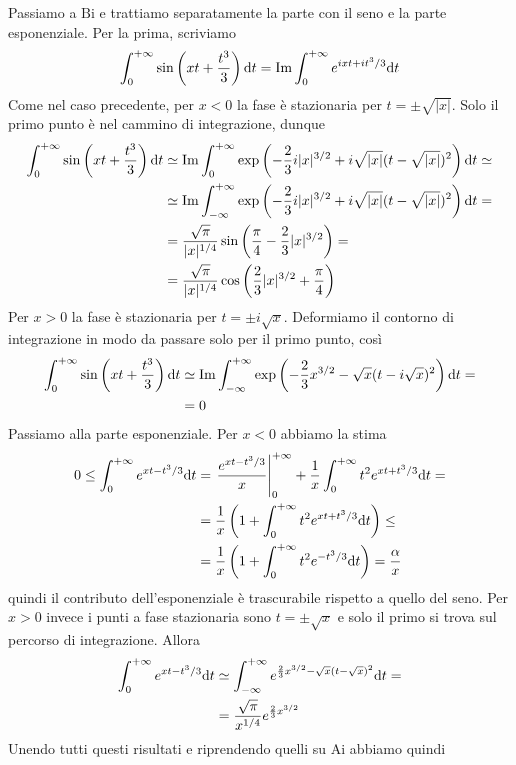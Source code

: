 \documentclass[11 pt]{article}
\newcommand{\ai}{\mathrm{Ai}}
\newcommand{\bi}{\mathrm{Bi}}
\renewcommand{\Im}{\mathrm{Im}}
\begin{document}
	Passiamo a $\bi$ e trattiamo separatamente la parte con il seno e la parte esponenziale. Per la prima, scriviamo
	\[\int_{0}^{+\infty}\sin\left(xt+\frac{t^3}{3}\right)\d t=\Im\int_{0}^{+\infty}e^{ixt+it^3/3}\d t\]
	Come nel caso precedente, per $x<0$ la fase è stazionaria per $t=\pm\sqrt{|x|}$. Solo il primo punto è nel cammino di integrazione, dunque
	\begin{align*}
		\int_{0}^{+\infty}\sin\left(xt+\frac{t^3}{3}\right)\d t&\simeq\Im\int_{0}^{+\infty}\exp\left(-\frac{2}{3}i|x|^{3/2}+i\sqrt{|x|}(t-\sqrt{|x|})^2\right)\d t\simeq\\&\simeq
		\Im\int_{-\infty}^{+\infty}\exp\left(-\frac{2}{3}i|x|^{3/2}+i\sqrt{|x|}(t-\sqrt{|x|})^2\right)\d t=\\&=\frac{\sqrt{\pi}}{|x|^{1/4}}\sin\left(\frac{\pi}{4}-\frac{2}{3}|x|^{3/2}\right)=\\&=\frac{\sqrt{\pi}}{|x|^{1/4}}\cos\left(\frac{2}{3}|x|^{3/2}+\frac{\pi}{4}\right)
	\end{align*} 
	Per $x>0$ la fase è stazionaria per $t=\pm i\sqrt{x}$. Deformiamo il contorno di integrazione in modo da passare solo per il primo punto, così
	\begin{align*}
	\int_{0}^{+\infty}\sin\left(xt+\frac{t^3}{3}\right)\d t&\simeq
	\Im\int_{-\infty}^{+\infty}\exp\left(-\frac{2}{3}x^{3/2}-\sqrt{x}(t-i\sqrt{x})^2\right)\d t=\\&=0
	\end{align*} 
	Passiamo alla parte esponenziale. Per $x<0$ abbiamo la stima
	\begin{align*}0\leq\int_{0}^{+\infty}e^{xt-t^3/3}\mathrm{d} t&=\left.\frac{e^{xt-t^3/3}}{x}\right|_0^{+\infty}+\frac{1}{x}\int_{0}^{+\infty}t^2e^{xt+t^3/3}\mathrm{d} t=\\&=\frac{1}{x}\left(1+\int_{0}^{+\infty}t^2e^{xt+t^3/3}\mathrm{d} t\right)\leq\\&=\frac{1}{x}\left(1+\int_{0}^{+\infty}t^2e^{-t^3/3}\mathrm{d} t\right)=\frac{\alpha}{x}\end{align*}
	quindi il contributo dell'esponenziale è trascurabile rispetto a quello del seno. Per $x>0$ invece i punti a fase stazionaria sono $t=\pm\sqrt{x}$ e solo il primo si trova sul percorso di integrazione. Allora
	\begin{align*}
		\int_{0}^{+\infty}e^{xt-t^3/3}\mathrm{d} t&\simeq\int_{-\infty}^{+\infty}e^{\frac{2}{3}x^{3/2}-\sqrt{x}(t-\sqrt{x})^2}\mathrm{d} t=\\&=\frac{\sqrt{\pi}}{x^{1/4}}e^{\frac{2}{3}x^{3/2}}
	\end{align*}
	Unendo tutti questi risultati e riprendendo quelli su $\ai$ abbiamo quindi
\end{document}
